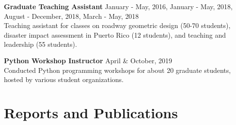 \documentclass[12pt]{article}
\begin{document}
\textbf{Graduate Teaching Assistant} \hfill January - May, 2016, January - May, 2018, August - December, 2018, March - May, 2018 \\
Teaching assistant for classes on roadway geometric design (50-70 students), disaster impact assessment in Puerto Rico (12 students), and teaching and leadership (55 students).

\textbf{Python Workshop Instructor} \hfill April \& October, 2019\\
Conducted Python programming workshops for about 20 graduate students, hosted by various student organizations. 


\bigskip
\section*{Reports and Publications}
\end{document}
